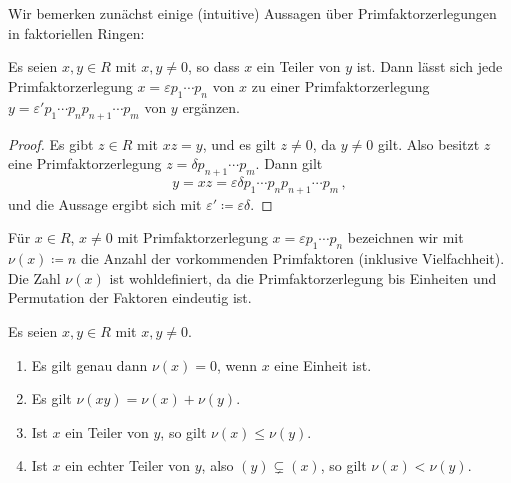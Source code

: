 \section{}





\subsection{}

Wir bemerken zunächst einige (intuitive) Aussagen über Primfaktorzerlegungen in faktoriellen Ringen:

\begin{lemma}
  \label{lemma: extension of prime factorizations}
  Es seien $x, y \in R$ mit $x, y \neq 0$, so dass $x$ ein Teiler von $y$ ist.
  Dann lässt sich jede Primfaktorzerlegung $x = \varepsilon p_1 \dotsm p_n$ von $x$ zu einer Primfaktorzerlegung $y = \varepsilon' p_1 \dotsm p_n p_{n+1} \dotsm p_m$ von $y$ ergänzen.
\end{lemma}

\begin{proof}
  Es gibt $z \in R$ mit $xz = y$, und es gilt $z \neq 0$, da $y \neq 0$ gilt.
  Also besitzt $z$ eine Primfaktorzerlegung $z = \delta p_{n+1} \dotsm p_m$.
  Dann gilt
  \[
      y
    = xz
    = \varepsilon \delta p_1 \dotsm p_n p_{n+1} \dotsm p_m \,,
  \]
  und die Aussage ergibt sich mit $\varepsilon' \coloneqq \varepsilon \delta$.
\end{proof}

Für $x \in R$, $x \neq 0$ mit Primfaktorzerlegung $x = \varepsilon p_1 \dotsm p_n$ bezeichnen wir mit $\nu(x) \coloneqq n$ die Anzahl der vorkommenden Primfaktoren (inklusive Vielfachheit).
Die Zahl $\nu(x)$ ist wohldefiniert, da die Primfaktorzerlegung bis Einheiten und Permutation der Faktoren eindeutig ist.

\begin{lemma}
  \label{lemma: number of prime factors}
  Es seien $x, y \in R$ mit $x, y \neq 0$.
  \begin{enumerate}
    \item
      Es gilt genau dann $\nu(x) = 0$, wenn $x$ eine Einheit ist.
    \item
      Es gilt $\nu(x y) = \nu(x) + \nu(y)$.
    \item
      Ist $x$ ein Teiler von $y$, so gilt $\nu(x) \leq \nu(y)$.
    \item
      Ist $x$ ein echter Teiler von $y$, also $(y) \subsetneq (x)$, so gilt $\nu(x) < \nu(y)$.
  \end{enumerate}
\end{lemma}

